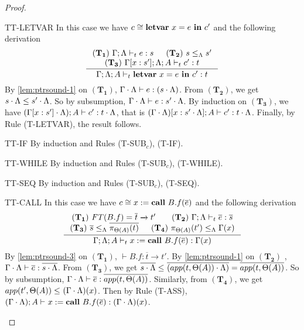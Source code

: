 {{{\begin{proof}
\begin{ProofEnumDesc}
\item[TT-LETVAR] %
In this case we have $c \cong {\textbf{letvar}~ {x} = {e} ~\textbf{in}~ {c'}}$ and the following derivation
\begin{equation*}
\inference
{(\mathbf{T_1}) ~\Gamma;\trace \vdash_{t} e : s &
(\mathbf{T_2}) ~s \leq_{\trace} s'  \\
(\mathbf{T_3}) ~\Gamma[x:s']; \trace; A \vdash_{t} c' : t }
{\Gamma;\trace; A\vdash_{t} \lcLETVAR{x}{e}{c'} :  t}
\end{equation*}
By \ref{lem:ptrsound-1} on $(\mathbf{T_1})$,  $\Gamma\cdot\Lambda \vdash e : (s\cdot \Lambda)$.
From $(\mathbf{T_2})$, we get $ s\cdot \Lambda \leq s'\cdot\Lambda$.
So by subsumption, $\Gamma\cdot\Lambda \vdash e : s'\cdot\Lambda$.
By induction on $(\mathbf{T_3})$,  we have $(\Gamma[x:s']\cdot \Lambda); A \vdash c' : t \cdot \Lambda$, that is $(\Gamma\cdot \Lambda)[x:s'\cdot \Lambda]; A \vdash c' : t\cdot \Lambda $.
Finally, by Rule {(T-LETVAR)}, the result follows.

\item[TT-IF] By induction and Rules {(T-SUB$_{c}$)}, {(T-IF)}.
\item[TT-WHILE] By induction and Rules {(T-SUB$_{c}$)}, {(T-WHILE)}.
\item[TT-SEQ] By induction and Rules {(T-SUB$_{c}$)}, {(T-SEQ)}.

\item[TT-CALL] In this case we have $c \cong {x}:=\textbf{call}~{B.f}({\overline{e}})$ and the following derivation
\begin{equation*}
\inference
{
(\mathbf{T_1})~\FT(B.f) = \overline{t} \xrightarrow{} t'  &
(\mathbf{T_2})~\Gamma;\trace \vdash_{t} \overline{e} : \overline{s}\\
(\mathbf{T_3})~\overline{s}\leq_{\trace} \overline{\app{t}{\Theta(A)}} &
(\mathbf{T_4})~\app{t'}{\Theta(A)}\leq_{\trace} \Gamma(x)
}
{\Gamma;\trace; A \vdash_{t} \lcCALL{x}{B.f}{\overline{e}} : \Gamma(x)}
\end{equation*}
By \ref{lem:ptrsound-3} on $(\mathbf{T_1})$, $\vdash B.f : \overline{t} \xrightarrow{} t'$.
By \ref{lem:ptrsound-1} on $(\mathbf{T_2})$ , $\Gamma\cdot\Lambda \vdash \overline{e} : \overline{s\cdot\Lambda}$.
From $(\mathbf{T_3})$, we get
$\overline{s\cdot \Lambda}\leq_{} \overline{(app(t,\Theta(A))\cdot \Lambda)} = \overline{app(t,\Theta(A))} $.
So by subsumption, $\Gamma\cdot\Lambda \vdash \overline{e} : \overline{app(t,\Theta(A))}$.
Similarly, from $(\mathbf{T_4})$, we get $app(t', \Theta(A))\leq_{} (\Gamma\cdot\Lambda)(x) $. Then by Rule {(T-ASS)}, $(\Gamma\cdot\Lambda); A \vdash_{} {x}:=\textbf{call}~{B.f}({\overline{e}}) : (\Gamma\cdot\Lambda)(x) $.


\end{ProofEnumDesc}
\end{proof}}}}
